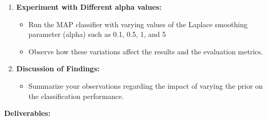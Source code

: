 \documentclass[a3paper,12pt]{extarticle} %
\begin{document}
\begin{enumerate}
\item \textbf{Experiment with Different alpha values:}
\begin{itemize}
    \item Run the MAP classifier with varying values of the Laplace smoothing parameter (alpha) such as 0.1, 0.5, 1, and 5
    \item Observe how these variations affect the results and the evaluation metrics.
\end{itemize}
\item \textbf{Discussion of Findings:}
\begin{itemize}
\item Summarize your observations regarding the impact of varying the prior on the classification performance.
\end{itemize}
\end{enumerate}
\textbf{Deliverables:}
\end{document}
